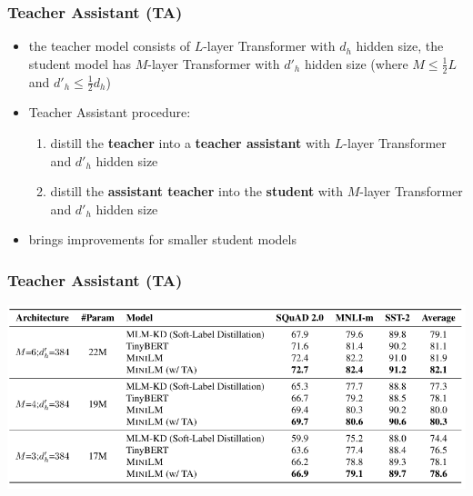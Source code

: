 \documentclass{beamer}
\begin{document}
\begin{frame}
    \frametitle{Teacher Assistant (TA)}
    \begin{itemize}
        \item the teacher model consists of $L$-layer Transformer with $d_h$ hidden size, the student model has $M$-layer Transformer with $d'_h$ hidden size (where $ M \leq \frac{1}{2} L$ and $d'_h \leq \frac{1}{2} d_h$)
        \item Teacher Assistant procedure:
        \begin{enumerate}
           \item distill the \textbf{teacher} into a \textbf{teacher assistant} with $L$-layer Transformer and $ d'_h $ hidden size
           \item distill the \textbf{assistant teacher} into the \textbf{student} with $M$-layer Transformer and $ d'_h $ hidden size
        \end{enumerate}
        \item brings improvements for smaller student models
    \end{itemize}
\end{frame}

\begin{frame}
    \frametitle{Teacher Assistant (TA)}
    \begin{center}
        \includegraphics[scale=0.4]{img/minilm_teacher_assistant.png}
    \end{center}
\end{frame}
\end{document}
